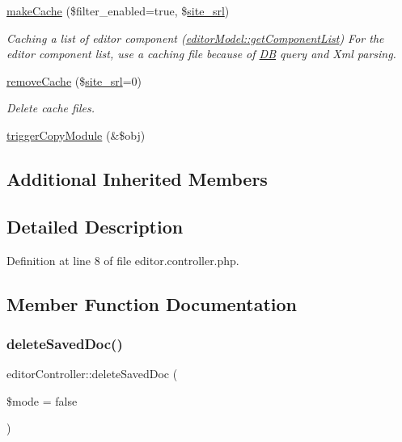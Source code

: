 \begin{DoxyCompactItemize}
\hyperlink{classeditorController_a246bf423c2f25208758a5cbcd2ba9890}{make\+Cache} (\$filter\+\_\+enabled=true, \$\hyperlink{ko_8install_8php_a8b1406b4ad1048041558dce6bfe89004}{site\+\_\+srl})
\begin{DoxyCompactList}\small\item\em Caching a list of editor component (\hyperlink{classeditorModel_a24cf5d2f9bc9783dd2efd85fb0f89408}{editor\+Model\+::get\+Component\+List}) For the editor component list, use a caching file because of \hyperlink{classDB}{DB} query and Xml parsing. \end{DoxyCompactList}\item 
\hyperlink{classeditorController_a0a512fff61d647692ad254eacafb8f0b}{remove\+Cache} (\$\hyperlink{ko_8install_8php_a8b1406b4ad1048041558dce6bfe89004}{site\+\_\+srl}=0)
\begin{DoxyCompactList}\small\item\em Delete cache files. \end{DoxyCompactList}\item 
\hyperlink{classeditorController_acccfd1dab6c8c48a2eb232ae2e46e6bf}{trigger\+Copy\+Module} (\&\$obj)
\end{DoxyCompactItemize}
\subsection*{Additional Inherited Members}


\subsection{Detailed Description}


Definition at line 8 of file editor.\+controller.\+php.



\subsection{Member Function Documentation}
\hypertarget{classeditorController_abfe95017a9b2baa548dde4a339af5df4}{}\label{classeditorController_abfe95017a9b2baa548dde4a339af5df4} 
\subsubsection{\texorpdfstring{delete\+Saved\+Doc()}{deleteSavedDoc()}}
{\footnotesize\ttfamily editor\+Controller\+::delete\+Saved\+Doc (\begin{DoxyParamCaption}\item[{}]{\$mode = {\ttfamily false} }\end{DoxyParamCaption})}




